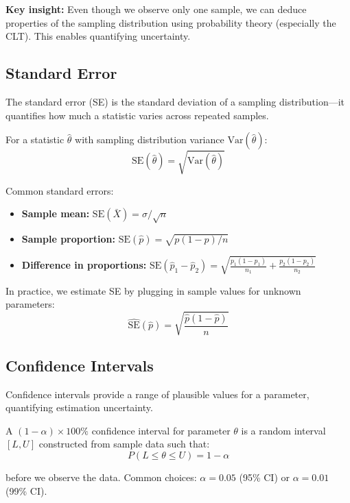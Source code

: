 \textbf{Key insight:} Even though we observe only one sample, we can deduce properties of the sampling distribution using probability theory (especially the CLT). This enables quantifying uncertainty.

\subsection{Standard Error}

The standard error (SE) is the standard deviation of a sampling distribution—it quantifies how much a statistic varies across repeated samples.

\begin{definition}
For a statistic $\hat{\theta}$ with sampling distribution variance $\text{Var}(\hat{\theta})$:
\begin{equation}
\text{SE}(\hat{\theta}) = \sqrt{\text{Var}(\hat{\theta})}
\end{equation}
\end{definition}

Common standard errors:
\begin{itemize}
    \item \textbf{Sample mean:} $\text{SE}(\bar{X}) = \sigma/\sqrt{n}$
    \item \textbf{Sample proportion:} $\text{SE}(\hat{p}) = \sqrt{p(1-p)/n}$
    \item \textbf{Difference in proportions:} $\text{SE}(\hat{p}_1 - \hat{p}_2) = \sqrt{\frac{p_1(1-p_1)}{n_1} + \frac{p_2(1-p_2)}{n_2}}$
\end{itemize}

In practice, we estimate SE by plugging in sample values for unknown parameters:
\begin{equation}
\widehat{\text{SE}}(\hat{p}) = \sqrt{\frac{\hat{p}(1-\hat{p})}{n}}
\end{equation}

\subsection{Confidence Intervals}

Confidence intervals provide a range of plausible values for a parameter, quantifying estimation uncertainty.

\begin{definition}
A $(1-\alpha) \times 100\%$ confidence interval for parameter $\theta$ is a random interval $[L, U]$ constructed from sample data such that:
\begin{equation}
P(L \leq \theta \leq U) = 1 - \alpha
\end{equation}

before we observe the data. Common choices: $\alpha = 0.05$ (95\% CI) or $\alpha = 0.01$ (99\% CI).
\end{definition}

